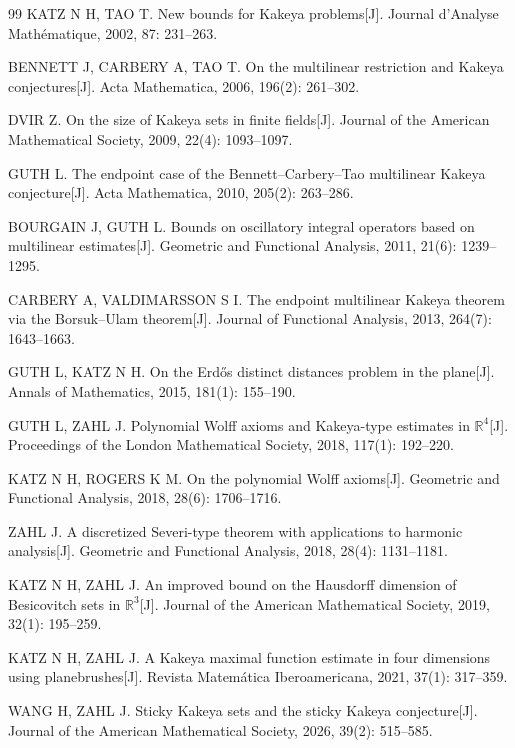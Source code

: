 \begin{thebibliography}{99}
KATZ N H, TAO T. New bounds for Kakeya problems[J]. Journal d'Analyse Math\'ematique, 2002, 87: 231--263.

BENNETT J, CARBERY A, TAO T. On the multilinear restriction and Kakeya conjectures[J]. Acta Mathematica, 2006, 196(2): 261--302.

DVIR Z. On the size of Kakeya sets in finite fields[J]. Journal of the American Mathematical Society, 2009, 22(4): 1093--1097.

GUTH L. The endpoint case of the Bennett--Carbery--Tao multilinear Kakeya conjecture[J]. Acta Mathematica, 2010, 205(2): 263--286.

BOURGAIN J, GUTH L. Bounds on oscillatory integral operators based on multilinear estimates[J]. Geometric and Functional Analysis, 2011, 21(6): 1239--1295.

CARBERY A, VALDIMARSSON S I. The endpoint multilinear Kakeya theorem via the Borsuk--Ulam theorem[J]. Journal of Functional Analysis, 2013, 264(7): 1643--1663.

GUTH L, KATZ N H. On the Erd\H{o}s distinct distances problem in the plane[J]. Annals of Mathematics, 2015, 181(1): 155--190.

GUTH L, ZAHL J. Polynomial Wolff axioms and Kakeya-type estimates in $\mathbb{R}^4$[J]. Proceedings of the London Mathematical Society, 2018, 117(1): 192--220.

KATZ N H, ROGERS K M. On the polynomial Wolff axioms[J]. Geometric and Functional Analysis, 2018, 28(6): 1706--1716.

ZAHL J. A discretized Severi-type theorem with applications to harmonic analysis[J]. Geometric and Functional Analysis, 2018, 28(4): 1131--1181.

KATZ N H, ZAHL J. An improved bound on the Hausdorff dimension of Besicovitch sets in $\mathbb{R}^3$[J]. Journal of the American Mathematical Society, 2019, 32(1): 195--259.

KATZ N H, ZAHL J. A Kakeya maximal function estimate in four dimensions using planebrushes[J]. Revista Matem\'atica Iberoamericana, 2021, 37(1): 317--359.

WANG H, ZAHL J. Sticky Kakeya sets and the sticky Kakeya conjecture[J]. Journal of the American Mathematical Society, 2026, 39(2): 515--585.


\end{thebibliography}
